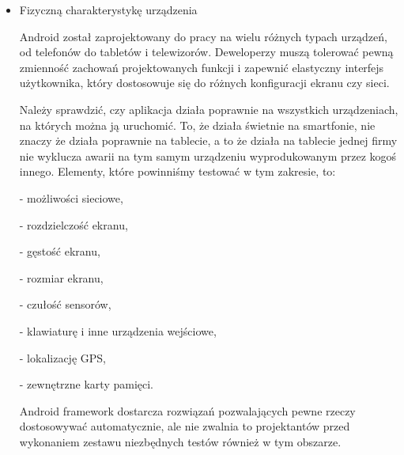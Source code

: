 \begin{itemize}
Według dokumentacji Android\cite{website:android:manual} możliwe są następujące opcje przechowywania danych:

- \textit{Shared Preferences}, czyli zachowywanie podstawowych danych w parach klucz - wartość,

- pamięć wewnętrzna urządzenia - do zachowywania danych niepublicznych,

- zewnętrzna karta pamięci - do zachowywania danych publicznych,

- baza danych SQLite - do przechowywania danych w prywatnej bazie danych,

- zasoby sieciowe - jako baza danych współdzielona pomiędzy urządzeniami.

Wszystkie te opcje korzystają ze wspólnego zestawu funkcji\footnote{Na przykład do obsługi plików używamy \textit{getFileDir(), getDir(), deleteFile()} itp.}, które tester powinien wziąć pod uwagę przy tworzeniu przypadków testowych.

\item{Fizyczną charakterystykę urządzenia}

Android został zaprojektowany do pracy na wielu różnych typach urządzeń, od telefonów do tabletów i telewizorów. Deweloperzy muszą tolerować pewną zmienność zachowań projektowanych funkcji i zapewnić elastyczny interfejs użytkownika, który dostosowuje się do różnych konfiguracji ekranu czy sieci.

Należy sprawdzić, czy aplikacja działa poprawnie na wszystkich urządzeniach, na których można ją uruchomić. To, że działa świetnie na smartfonie, nie znaczy że działa poprawnie na tablecie, a to że działa na tablecie jednej firmy nie wyklucza awarii na tym samym urządzeniu wyprodukowanym przez kogoś innego. Elementy, które powinniśmy testować w tym zakresie, to:

- możliwości sieciowe,

- rozdzielczość ekranu,

- gęstość ekranu,

- rozmiar ekranu,

- czułość sensorów,

- klawiaturę i inne urządzenia wejściowe,

- lokalizację GPS,

- zewnętrzne karty pamięci.

Android framework dostarcza rozwiązań pozwalających pewne rzeczy dostosowywać automatycznie, ale nie zwalnia to projektantów przed wykonaniem zestawu niezbędnych testów również w tym obszarze.

\end{itemize}

